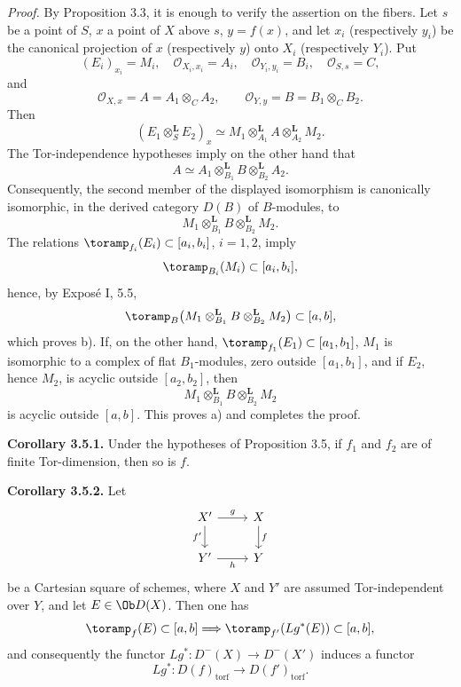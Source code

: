 \documentclass[11pt]{article}
\begin{document}
\emph{Proof.} By Proposition 3.3, it is enough to verify the assertion on the fibers. Let \(s\) be a point of \(S\), \(x\) a point of \(X\) above \(s\), \(y=f(x)\), and let \(x_i\) (respectively \(y_i\)) be the canonical projection of \(x\) (respectively \(y\)) onto \(X_i\) (respectively \(Y_i\)). Put
\[
  (E_i)_{x_i}=M_i,\quad
  \mathcal O_{X_i,x_i}=A_i,\quad
  \mathcal O_{Y_i,y_i}=B_i,\quad
  \mathcal O_{S,s}=C,
\]
and
\[
  \mathcal O_{X,x}=A=A_1\otimes_C A_2,\qquad
  \mathcal O_{Y,y}=B=B_1\otimes_C B_2.
\]
Then
\[
  (E_1\otimes_S^{\mathbf L}E_2)_x
  \simeq
  M_1\otimes_{A_1}^{\mathbf L} A
  \otimes_{A_2}^{\mathbf L} M_2.
\]
The Tor-independence hypotheses imply on the other hand that
\[
  A\simeq A_1\otimes_{B_1}^{\mathbf L}B
       \otimes_{B_2}^{\mathbf L}A_2.
\]
Consequently, the second member of the displayed isomorphism is canonically isomorphic, in the derived category \(D(B)\) of \(B\)-modules, to
\[
  M_1\otimes_{B_1}^{\mathbf L}B
       \otimes_{B_2}^{\mathbf L}M_2.
\]
The relations \(\toramp_{f_i}(E_i)\subset[a_i,b_i]\), \(i=1,2\), imply
\[
  \toramp_{B_i}(M_i)\subset[a_i,b_i],
\]
hence, by Exposé I, 5.5,
\[
  \toramp_B\bigl(M_1\otimes_{B_1}^{\mathbf L}B
  \otimes_{B_2}^{\mathbf L}M_2\bigr)\subset[a,b],
\]
which proves b). If, on the other hand, \(\toramp_{f_1}(E_1)\subset[a_1,b_1]\), \(M_1\) is isomorphic to a complex of flat \(B_1\)-modules, zero outside \([a_1,b_1]\), and if \(E_2\), hence \(M_2\), is acyclic outside \([a_2,b_2]\), then
\[
  M_1\otimes_{B_1}^{\mathbf L}B\otimes_{B_2}^{\mathbf L}M_2
\]
is acyclic outside \([a,b]\). This proves a) and completes the proof.

\textbf{Corollary 3.5.1.} Under the hypotheses of Proposition 3.5, if \(f_1\) and \(f_2\) are of finite Tor-dimension, then so is \(f\).

\textbf{Corollary 3.5.2.} Let
\[
\begin{tikzcd}
X' \arrow[r,"g"] \arrow[d,"f'"'] & X \arrow[d,"f"]\\
Y' \arrow[r,"h"'] & Y
\end{tikzcd}
\]
be a Cartesian square of schemes, where \(X\) and \(Y'\) are assumed Tor-independent over \(Y\), and let \(E\in \Ob D(X)\). Then one has
\[
  \toramp_f(E)\subset[a,b]\Longrightarrow
  \toramp_{f'}(Lg^*(E))\subset[a,b],
\]
and consequently the functor \(Lg^*:D^{-}(X)\to D^{-}(X')\) induces a functor
\[
  Lg^*:D(f)_{\mathrm{torf}}\longrightarrow D(f')_{\mathrm{torf}} .
\]
\end{document}
